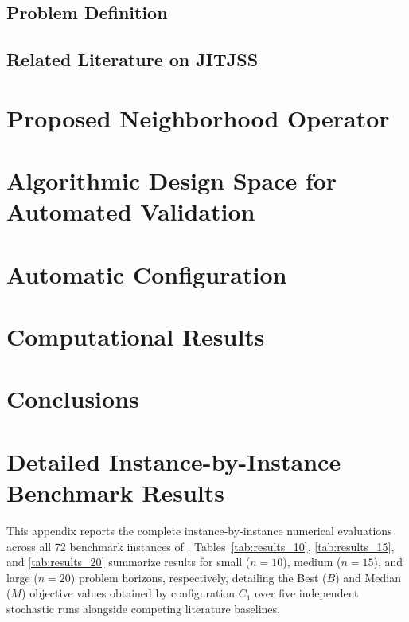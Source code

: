 \documentclass[preprint,12pt,authoryear]{elsarticle}
\begin{document}


\subsection{Problem Definition}
\label{subsec:prob}


\subsection{Related Literature on JITJSS}
\label{subsec:litrev}


\section{Proposed Neighborhood Operator}
\label{sec:swap_crit}



\section{Algorithmic Design Space for Automated Validation}
\label{sec:design_space}


\section{Automatic Configuration}
\label{sec:config_process}


\section{Computational Results}
\label{sec:results}


\section{Conclusions}
\label{sec:conclu}



\FloatBarrier
\appendix
\section{Detailed Instance-by-Instance Benchmark Results}
\label{app:detailed_results}

This appendix reports the complete instance-by-instance numerical evaluations across all 72 benchmark instances of \citet{baptiste2008lagrangian}.
Tables~\ref{tab:results_10}, \ref{tab:results_15}, and \ref{tab:results_20} summarize results for small ($n = 10$), medium ($n = 15$), and large ($n = 20$) problem horizons, respectively, detailing the Best ($B$) and Median ($M$) objective values obtained by configuration $C_1$ over five independent stochastic runs alongside competing literature baselines.




\FloatBarrier
  
 
\end{document}
